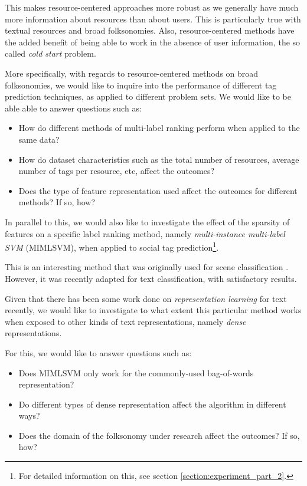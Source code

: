 This makes resource-centered approaches more robust as we generally have much more information about resources than about users. This is particularly true with textual resources and broad folksonomies. Also, resource-centered methods have the added benefit of being able to work in the absence of user information, the so called \textit{cold start} problem.

More specifically, with regards to resource-centered methods on broad folksonomies, we would like to inquire into the performance of different tag prediction techniques, as applied to different problem sets. We would like to be able able to answer questions such as:

\begin{itemize}
    \item How do different methods of multi-label ranking perform when applied to the same data?
    
    \item How do dataset characteristics such as the total number of resources, average number of tags per resource, etc, affect the outcomes?
    
    \item Does the type of feature representation used affect the outcomes for different methods? If so, how?

\end{itemize}

In parallel to this, we would also like to investigate the effect of the sparsity of features on a specific label ranking method, namely \textit{multi-instance multi-label SVM} (MIMLSVM), when applied to social tag prediction\footnote{For detailed  information on this, see section \ref{section:experiment_part_2}.}. 

This is an interesting method that was originally used for scene classification \citep{zhang_zhou_2007}. However, it was recently \citep{shen_etal_2009} adapted for text classification, with satisfactory results.

Given that there has been some work done on \textit{representation learning} for text \citep{bengio_etal_2003,efficientestimation,le_mikolov_2014} recently, we would like to investigate to what extent this particular method works when exposed to other kinds of text representations, namely \textit{dense} representations.

For this, we would like to answer questions such as:

\begin{itemize}
    \item Does MIMLSVM only work for the commonly-used bag-of-words representation?
    
    \item Do different types of dense representation affect the algorithm in different ways?
    
    \item Does the domain of the folksonomy under research affect the outcomes? If so, how?

\end{itemize}


